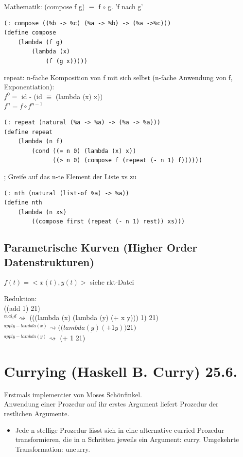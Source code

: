 \documentclass[a4paper, 20pt, openany]{book}
\begin{document}
Mathematik: (compose f g) $\equiv$ f $\circ$ g. 'f nach g'\\
\begin{lstlisting}
(: compose ((%b -> %c) (%a -> %b) -> (%a ->%c)))
(define compose
	(lambda (f g)
		(lambda (x)
			(f (g x)))))
\end{lstlisting}
repeat: n-fache Komposition von f mit sich selbst (n-fache Anwendung von f, Exponentiation):\\
$f^0 = $ id - (id $\equiv$ (lambda (x) x))\\
$f^n = f \circ f^{n-1}$
\begin{lstlisting}
(: repeat (natural (%a -> %a) -> (%a -> %a)))
(define repeat
	(lambda (n f)
		(cond ((= n 0) (lambda (x) x))
		      ((> n 0) (compose f (repeat (- n 1) f))))))
\end{lstlisting}

; Greife auf das n-te Element der Liste xs zu
\begin{lstlisting}
(: nth (natural (list-of %a) -> %a))
(define nth 
	(lambda (n xs)
		((compose first (repeat (- n 1) rest)) xs)))
\end{lstlisting}

\section{Parametrische Kurven (Higher Order Datenstrukturen)}
$f(t) = <x(t), y(t)>$
siehe rkt-Datei

Reduktion:\\
((add 1) 21)\\
$^{eval_id} \rightsquigarrow$ (((lambda (x) (lambda (y) (+ x y))) 1) 21)\\
$^{apply-lambda(x)} \rightsquigarrow \underline{ ((lambda (y) (+ 1 y)}) 21)$\\
$^{apply-lambda(y)} \rightsquigarrow$ (+ 1 21)

\chapter{Currying (Haskell B. Curry) 25.6.}
Erstmals implementier von Moses Schönfinkel.\\
Anwendung einer Prozedur auf ihr erstes Argument liefert Prozedur der restlichen Argumente.
\begin{itemize}
\item Jede n-stellige Prozedur lässt sich in eine alternative curried Prozedur transformieren, die in n Schritten jeweils ein Argument: curry. Umgekehrte Transformation: uncurry.
\end{itemize}
\end{document}
